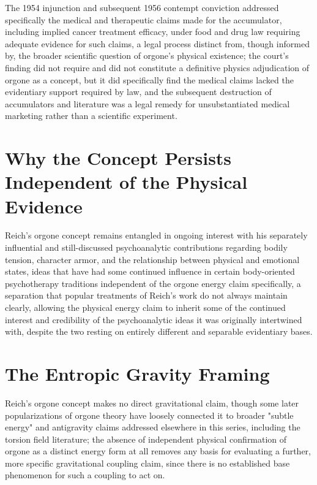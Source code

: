\documentclass[11pt]{article}
\begin{document}
The 1954 injunction and subsequent 1956 contempt conviction addressed specifically the medical and therapeutic claims made for the accumulator, including implied cancer treatment efficacy, under food and drug law requiring adequate evidence for such claims, a legal process distinct from, though informed by, the broader scientific question of orgone's physical existence; the court's finding did not require and did not constitute a definitive physics adjudication of orgone as a concept, but it did specifically find the medical claims lacked the evidentiary support required by law, and the subsequent destruction of accumulators and literature was a legal remedy for unsubstantiated medical marketing rather than a scientific experiment.

\section{Why the Concept Persists Independent of the Physical Evidence}

Reich's orgone concept remains entangled in ongoing interest with his separately influential and still-discussed psychoanalytic contributions regarding bodily tension, character armor, and the relationship between physical and emotional states, ideas that have had some continued influence in certain body-oriented psychotherapy traditions independent of the orgone energy claim specifically, a separation that popular treatments of Reich's work do not always maintain clearly, allowing the physical energy claim to inherit some of the continued interest and credibility of the psychoanalytic ideas it was originally intertwined with, despite the two resting on entirely different and separable evidentiary bases.

\section{The Entropic Gravity Framing}

Reich's orgone concept makes no direct gravitational claim, though some later popularizations of orgone theory have loosely connected it to broader "subtle energy" and antigravity claims addressed elsewhere in this series, including the torsion field literature; the absence of independent physical confirmation of orgone as a distinct energy form at all removes any basis for evaluating a further, more specific gravitational coupling claim, since there is no established base phenomenon for such a coupling to act on.
\end{document}
